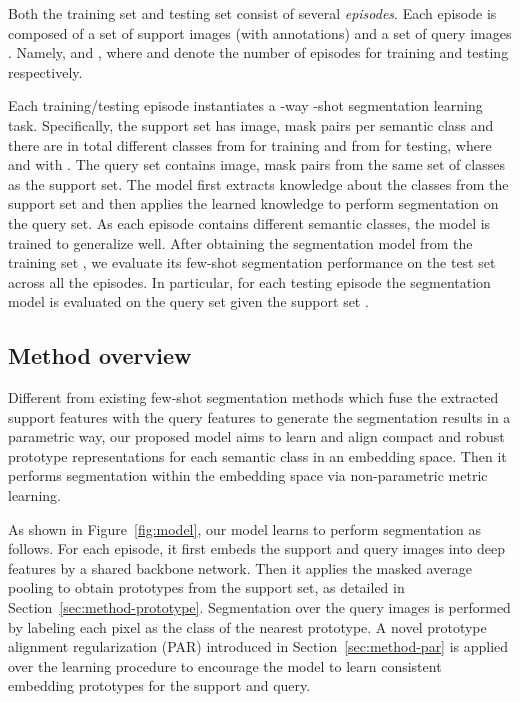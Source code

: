 \documentclass[10pt,twocolumn,letterpaper]{article}
\begin{document}
 
Both the training set  and testing set  consist of several \textit{episodes}.  Each episode is composed of a set of support images   (with annotations) and a set of query images .  Namely,  and , where  and  denote the number of episodes for training and testing respectively. 

Each training/testing episode  instantiates a -way -shot segmentation learning task. Specifically, the support set  has  image, mask pairs per semantic class and there are in total  different classes from  for training and from  for testing, \ie  where  and  with .
The query set  contains  image, mask pairs from the same set of classes  as the support set. The model first extracts knowledge about the  classes from the support set and then applies the learned knowledge to perform segmentation on the query set. As each episode contains different semantic classes, the model is trained to generalize well.
After obtaining the segmentation model  from the training set , we evaluate its few-shot segmentation performance on the test set  across all the episodes. In particular, for each testing episode the segmentation model  is evaluated on the query set  given the support set .

\subsection{Method overview}

Different from existing few-shot segmentation methods which fuse the extracted support features with the query features to generate the segmentation results in a parametric way, our proposed model aims to learn and align compact and robust prototype representations for each semantic class in an embedding space. Then it performs segmentation within the embedding space via non-parametric metric learning.

As shown in Figure~\ref{fig:model}, our model learns to perform segmentation as follows. For each episode, it first embeds the support and query images into deep features by a shared backbone network. Then it applies the masked average pooling  to obtain prototypes from the support set, as detailed in Section~\ref{sec:method-prototype}. Segmentation over the query images is performed by labeling each pixel as the class of the nearest prototype. A novel prototype alignment regularization (PAR) introduced in Section~\ref{sec:method-par} is applied over the learning procedure to encourage the model to learn consistent embedding prototypes for the support and query.
\end{document}
